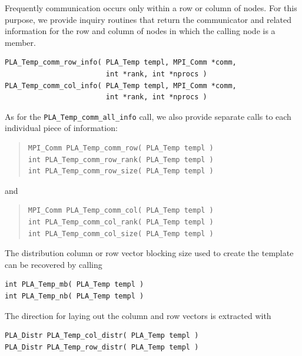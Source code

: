 Frequently communication occurs only within a row or column of nodes.  
For this purpose, we provide inquiry routines that return the communicator and
related information for the row and column of nodes in which the calling node is a member.
\begin{FlaSpec}
\begin{verbatim}
PLA_Temp_comm_row_info( PLA_Temp templ, MPI_Comm *comm, 
                        int *rank, int *nprocs )
PLA_Temp_comm_col_info( PLA_Temp templ, MPI_Comm *comm, 
                        int *rank, int *nprocs )
\end{verbatim}
\end{FlaSpec}
As for the {\tt PLA\_Temp\_comm\_all\_info} call, we also provide separate calls to each
individual piece of information:
\begin{quote}
\begin{verbatim}
MPI_Comm PLA_Temp_comm_row( PLA_Temp templ )
int PLA_Temp_comm_row_rank( PLA_Temp templ )
int PLA_Temp_comm_row_size( PLA_Temp templ )
\end{verbatim}
\end{quote}
and
\begin{quote}
\begin{verbatim}
MPI_Comm PLA_Temp_comm_col( PLA_Temp templ )
int PLA_Temp_comm_col_rank( PLA_Temp templ )
int PLA_Temp_comm_col_size( PLA_Temp templ )
\end{verbatim}
\end{quote}

The distribution column or row vector blocking size used to create the template 
can be recovered by calling
\begin{FlaSpec}
\begin{verbatim}
int PLA_Temp_mb( PLA_Temp templ )
int PLA_Temp_nb( PLA_Temp templ )
\end{verbatim}
\end{FlaSpec}

The direction for laying out the column and row vectors is extracted with
\begin{FlaSpec}
\begin{verbatim}
PLA_Distr PLA_Temp_col_distr( PLA_Temp templ )
PLA_Distr PLA_Temp_row_distr( PLA_Temp templ )
\end{verbatim}
\end{FlaSpec}

